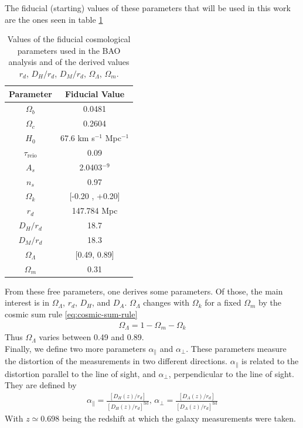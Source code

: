 The fiducial (starting) values of these parameters that will be used in this work are the ones seen in table \ref{tab:fid-values}
\begin{table}[t]
\begin{center}
\begin{tabular}{|c|c|}
\hline
Parameter & Fiducial Value \\
\hline
$\Omega_b$ & 0.0481 \\
$\Omega_c$ & 0.2604 \\
$H_0$ & 67.6 km s$^{-1}$ Mpc$^{-1}$ \\
$\tau_{\text{reio}}$ & 0.09 \\
$A_s$ & 2.0403\cdot 10$^{-9}$ \\
$n_s$ & 0.97 \\
\hline
$\Omega_k$ & [-0.20 , +0.20]  \\
\hline
\hline
$r_d$ & 147.784 Mpc \\
$D_H/r_d$ & 18.7 \\
$D_M/r_d$ & 18.3 \\
$\Omega_\Lambda$ & [0.49, 0.89] \\
$\Omega_m$ & 0.31  \\
\hline
\end{tabular}
\end{center}
\caption{Values of the fiducial cosmological parameters used in the BAO analysis and of the derived values $r_d$, $D_H / r_d$, $D_M /r_d$, $\Omega_\Lambda$, $\Omega_m$.}
\label{tab:fid-values}
\end{table}
From these free parameters, one derives some parameters. Of those, the main interest is in $\Omega_\Lambda$, $r_d$, $D_H$, and $D_A$. $\Omega_\Lambda$ changes with $\Omega_k$ for a fixed $\Omega_m$ by the cosmic sum rule \eqref{eq:cosmic-sum-rule}
\begin{align}
	\Omega_\Lambda =  1 - \Omega_m - \Omega_k
\end{align}
Thus $\Omega_\Lambda$ varies between 0.49 and 0.89.\\

Finally, we define two more parameters $\alpha_\parallel$ and $\alpha_\perp$. These parameters measure the distortion of the measurements in two different directions. $\alpha_\parallel$ is related to the distortion parallel to the line of sight, and  $\alpha_\perp$, perpendicular to the line of sight. They are defined by 
\begin{align}
	\alpha_\parallel = \frac{\left[ D_H(z) /r_d \right] }{\left[ D_H(z)/r_d \right]^{\text{fid}} }, \, \alpha_\perp = \frac{\left[ D_A(z) /r_d \right] }{\left[ D_A(z)/r_d \right]^{\text{fid}} }
	\label{eq:alphas-def}
\end{align}
With $z\simeq 0.698$ being the redshift at which the galaxy measurements were taken.
